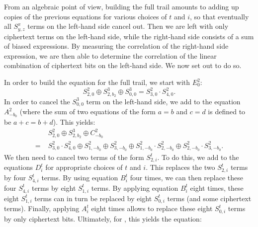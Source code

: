 From an algebraic point of view, building the full trail amounts to adding up copies of the previous equations for various choices of $t$ and $i$, so that eventually all $S^x_{y,z}$ terms on the left-hand side cancel out. Then we are left with only ciphertext terms on the left-hand side, while the right-hand side consists of a sum of biased expressions. By measuring the correlation of the right-hand side expression, we are then able to determine the correlation of the linear combination of ciphertext bits on the left-hand side. We now set out to do so.

In order to build the equation for the full trail, we start with $E^2_0$:
\[
S^2_{2,0} \oplus S^{3}_{2,b_2} \oplus S^{3}_{0,0} = S^2_{3,0} \cdot S^2_{4,0}.
\]
In order to cancel the $S^{3}_{0,0}$ term on the left-hand side, we add to the equation $A^2_{-b_0}$ (where the sum of two equations of the form $a = b$ and $c = d$ is defined to be $a+c = b+d$). This yields:
\begin{align*}
&S^2_{2,0} \oplus S^3_{2,b_2} \oplus C^2_{-b_0}\\
=\; &S^2_{3,0} \cdot S^2_{4,0} \oplus S^2_{1,-b_0} \oplus S^2_{3,-b_0} \oplus S^2_{1,-b_0} \cdot S^2_{2,-b_0} \oplus S^2_{2,-b_0} \cdot S^2_{3,-b_0}.
\end{align*}
We then need to cancel two terms of the form $S^t_{2,i}$. To do this, we add to the equations $D^t_i$ for appropriate choices of $t$ and $i$. This replaces the two $S^t_{2,i}$ terms by four $S^t_{4,i}$ terms. By using equation $B^t_i$ four times, we can then replace these four $S^t_{4,i}$ terms by eight $S^t_{1,i}$ terms. By applying equation $B^t_i$ eight times, these eight $S^t_{1,i}$ terms can in turn be replaced by eight $S^t_{0,i}$ terms (and some ciphertext terms). Finally, applying $A^t_i$ eight times allows to replace these eight $S^t_{0,i}$ terms by only ciphertext bits. Ultimately, for \MiniMORUS[1280], this yields the equation:

